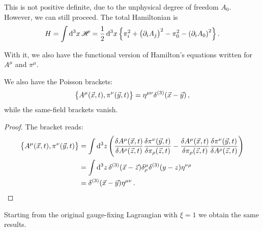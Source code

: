 \documentclass[main.tex]{subfiles}
\begin{document}
This is not positive definite, due to the unphysical degree of freedom \(A_0 \).
However, we can still proceed. The total Hamiltonian is 
%
\begin{align}
H = \int \dd[3]{x} \mathscr{H} = \frac{1}{2} \dd[3]{x}
\qty{ \pi_{i}^2  + \qty(\partial_{i} A_{j})^2 - \pi_0^2 - \qty(\partial_{i} A_{0})^2}
\,.
\end{align}

With it, we also have the functional version of Hamilton's equations written for \(A^{\mu }\) and \(\pi^{\mu }\). 

\begin{claim}
We also have the Poisson brackets: 
%
\begin{align}
    \qty{A^{\mu } (\vec{x}, t), \pi^{\nu }(\vec{y}, t)} = \eta^{\mu \nu }
    \delta^{(3)} (\vec{x} - \vec{y})
    \,,
\end{align}
%
while the same-field brackets vanish.
\end{claim} 

\begin{proof}
The bracket reads: 
%
\begin{subequations}
\begin{align}
\qty{A^{\mu } (\vec{x}, t), \pi^{\nu }(\vec{y}, t)}
&= \int \dd[3]{z} \qty(
\fdv{A^{\mu }(\vec{x}, t)}{A^{\rho }(\vec{z}, t)}
\fdv{\pi ^{\nu }(\vec{y}, t)}{\pi _{\rho }(\vec{z}, t)}
-
\fdv{A^{\mu }(\vec{x}, t)}{\pi _{\rho }(\vec{z}, t)}
\fdv{\pi ^{\nu }(\vec{y}, t)}{A^{\rho }(\vec{z}, t)}
)  \\
&= \int \dd[3]{z} \delta^{(3)} (\vec{x} - \vec{z}) \delta^{\mu }_{\rho }
\delta^{(3)}(y-z) \eta^{\nu \rho }  \\
&= \delta^{(3)} (\vec{x} - \vec{y}) \eta^{\mu \nu }
\,.
\end{align}
\end{subequations}
\end{proof}

\begin{claim}
Starting from the original gauge-fixing Lagrangian with \(\xi = 1\) we obtain the same results. 
\end{claim}

\end{document}
